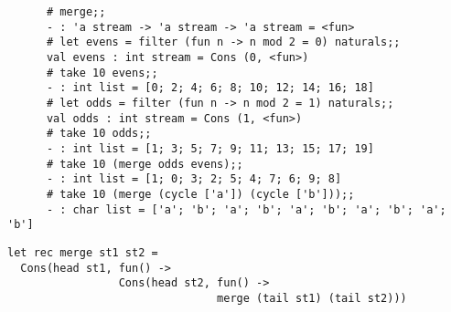 \documentclass[addpoints]{exam}
\begin{document}
\begin{questions}
  {\footnotesize
    \begin{verbatim}
      # merge;;
      - : 'a stream -> 'a stream -> 'a stream = <fun>
      # let evens = filter (fun n -> n mod 2 = 0) naturals;;
      val evens : int stream = Cons (0, <fun>)
      # take 10 evens;;
      - : int list = [0; 2; 4; 6; 8; 10; 12; 14; 16; 18]
      # let odds = filter (fun n -> n mod 2 = 1) naturals;;
      val odds : int stream = Cons (1, <fun>)
      # take 10 odds;;                                     
      - : int list = [1; 3; 5; 7; 9; 11; 13; 15; 17; 19]
      # take 10 (merge odds evens);;
      - : int list = [1; 0; 3; 2; 5; 4; 7; 6; 9; 8]
      # take 10 (merge (cycle ['a']) (cycle ['b']));;
      - : char list = ['a'; 'b'; 'a'; 'b'; 'a'; 'b'; 'a'; 'b'; 'a'; 'b']
    \end{verbatim}
  }  
  \begin{solutionbox}{3cm}
    {\footnotesize
    \begin{verbatim}
let rec merge st1 st2 =
  Cons(head st1, fun() ->
                 Cons(head st2, fun() ->
                                merge (tail st1) (tail st2)))
    \end{verbatim}
    }
  \end{solutionbox}

\end{questions}
\end{document}
